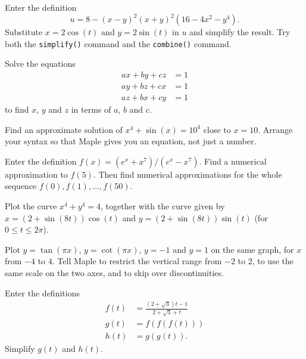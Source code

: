 \documentclass[a4paper,10pt]{amsbook}
\numberwithin{example}{chapter}
\begin{document}
\begin{exercise}
 Enter the definition
 \[ u = 8 - (x-y)^2 (x+y)^2 (16 - 4x^2 - y^4). \]
 Substitute $x=2\cos(t)$ and $y=2\sin(t)$ in $u$ and
 simplify the result.  Try both the \verb~simplify()~
 command and the \verb~combine()~ command.
\end{exercise}

\begin{exercise}
 Solve the equations
 \begin{align*}
  ax+by+cz &= 1 \\
  ay+bz+cx &= 1 \\
  az+bx+cy &= 1
 \end{align*}
 to find $x$, $y$ and $z$ in terms of $a$, $b$ and $c$.
\end{exercise}

\begin{exercise}
 Find an approximate solution of $x^4+\sin(x)=10^4$ close
 to $x=10$.  Arrange your syntax so that Maple gives you an
 equation, not just a number.
\end{exercise}

\begin{exercise}
 Enter the definition $f(x)=(e^x+x^7)/(e^x-x^7)$.  Find
 a numerical approximation to $f(5)$.  Then find numerical
 approximations for the whole sequence
 $f(0),f(1),\dotsc,f(50)$. 
\end{exercise}

\begin{exercise}
 Plot the curve $x^4+y^4=4$, together with the curve given
 by $x=(2+\sin(8t))\cos(t)$ and $y=(2+\sin(8t))\sin(t)$ (for
 $0\leq t\leq 2\pi$).
\end{exercise}

\begin{exercise}
 Plot $y=\tan(\pi x)$, $y=\cot(\pi x)$, $y=-1$ and $y=1$ on
 the same graph, for $x$ from $-4$ to $4$.  Tell Maple to
 restrict the vertical range from $-2$ to $2$, to use the
 same scale on the two axes, and to skip over
 discontinuities.
\end{exercise}

\begin{exercise}
 Enter the definitions
 \begin{align*}
  f(t) &= \frac{(2+\sqrt{3})t-1}{2+\sqrt{3}+t} \\
  g(t) &= f(f(f(t))) \\
  h(t) &= g(g(t)).
 \end{align*}
 Simplify $g(t)$ and $h(t)$.
\end{exercise}
\end{document}
